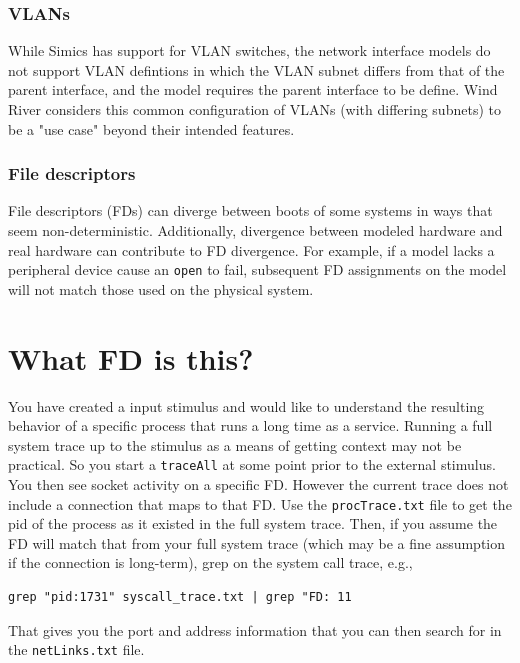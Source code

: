 \documentclass[titlepage]{article}
\begin{document}
\begin{appendices}
\subsubsection{VLANs}
While Simics has support for VLAN switches, the network interface models do not support
VLAN defintions in which the VLAN subnet differs from that of the parent interface, and the model
requires the parent interface to be define.  Wind River considers this common configuration
of VLANs (with differing subnets) to be a "use case" beyond their intended features.

\subsubsection{File descriptors}
File descriptors (FDs) can diverge between boots of some systems in ways that seem non-deterministic.
Additionally, divergence between modeled hardware and real hardware can contribute to FD divergence.
For example, if a model lacks a peripheral device cause an {\tt open} to fail, subsequent FD assignments
on the model will not match those used on the physical system.  

\section{What FD is this?}
You have created a input stimulus and would like to understand the resulting behavior of a specific process
that runs a long time as a service.
Running a full system trace up to the stimulus as a means of getting context may not be practical.  So you start
a {\tt traceAll} at some point prior to the external stimulus.  You then see socket activity on a specific FD.
However the current trace does not include a connection that maps to that FD.  Use the {\tt procTrace.txt}
file to get the pid of the process as it existed in the full system trace.  Then, if you assume the FD will match
that from your full system trace (which may be a fine assumption if the connection is long-term), grep on 
the system call trace, e.g.,
\begin{verbatim}
grep "pid:1731" syscall_trace.txt | grep "FD: 11
\end{verbatim}
That gives you the port and address information that you can then search for in the {\tt netLinks.txt} file.


\end{appendices}
\end{document}
